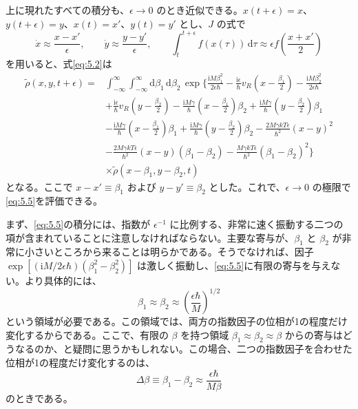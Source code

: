 上に現れたすべての積分も、$\epsilon\to0$ のとき近似できる。$x(t+\epsilon)=x$、$y(t+\epsilon)=y$、$x(t)=x'$、$y(t)=y'$ とし、$J$ の式で
\begin{equation}
\dot x\approx\frac{x-x'}{\epsilon},\qquad
\dot y\approx\frac{y-y'}{\epsilon},\qquad
\int_t^{t+\epsilon}f(x(\tau))\,\mathrm d\tau
\approx\epsilon f\!\left(\frac{x+x'}{2}\right)
\tag{5.4}\label{eq:5.4}
\end{equation}
を用いると、式\eqref{eq:5.2}は
\begin{equation}
\begin{aligned}
\widetilde\rho(x,y,t+\epsilon)
={}&\int_{-\infty}^{\infty}\!\int_{-\infty}^{\infty}
\mathrm d\beta_1\,\mathrm d\beta_2\,
\exp\biggl\{\frac{\mathrm iM\beta_1^2}{2\epsilon\hbar}
-\frac{\mathrm i\epsilon}{\hbar}v_R\!\left(x-\frac{\beta_1}{2}\right)
-\frac{\mathrm iM\beta_2^2}{2\epsilon\hbar}\\
&+\frac{\mathrm i\epsilon}{\hbar}v_R\!\left(y-\frac{\beta_2}{2}\right)
-\frac{\mathrm iM\gamma}{\hbar}\left(x-\frac{\beta_1}{2}\right)\beta_2
+\frac{\mathrm iM\gamma}{\hbar}\left(y-\frac{\beta_2}{2}\right)\beta_1\\
&-\frac{\mathrm iM\gamma}{\hbar}\left(x-\frac{\beta_1}{2}\right)\beta_1
+\frac{\mathrm iM\gamma}{\hbar}\left(y-\frac{\beta_2}{2}\right)\beta_2
-\frac{2M\gamma kT\epsilon}{\hbar^2}(x-y)^2\\
&-\frac{2M\gamma kT\epsilon}{\hbar^2}(x-y)(\beta_1-\beta_2)
-\frac{M\gamma kT\epsilon}{\hbar^2}(\beta_1-\beta_2)^2\biggr\}\\
&\times\widetilde\rho(x-\beta_1,y-\beta_2,t)
\end{aligned}
\tag{5.5}\label{eq:5.5}
\end{equation}
となる。ここで $x-x'\equiv\beta_1$ および $y-y'\equiv\beta_2$ とした。これで、$\epsilon\to0$ の極限で\eqref{eq:5.5}を評価できる。

まず、\eqref{eq:5.5}の積分には、指数が $\epsilon^{-1}$ に比例する、非常に速く振動する二つの項が含まれていることに注意しなければならない。主要な寄与が、$\beta_1$ と $\beta_2$ が非常に小さいところから来ることは明らかである。そうでなければ、因子 $\exp[(\mathrm iM/2\epsilon\hbar)(\beta_1^2-\beta_2^2)]$ は激しく振動し、\eqref{eq:5.5}に有限の寄与を与えない。より具体的には、
\begin{equation}
\beta_1\approx\beta_2\approx\left(\frac{\epsilon\hbar}{M}\right)^{1/2}
\tag{5.6}\label{eq:5.6}
\end{equation}
という領域が必要である。この領域では、両方の指数因子の位相が1の程度だけ変化するからである。ここで、有限の $\beta$ を持つ領域 $\beta_1\approx\beta_2\approx\beta$ からの寄与はどうなるのか、と疑問に思うかもしれない。この場合、二つの指数因子を合わせた位相が1の程度だけ変化するのは、
\begin{equation}
\Delta\beta\equiv\beta_1-\beta_2\approx\frac{\epsilon\hbar}{M\beta}
\tag{5.7}\label{eq:5.7}
\end{equation}
のときである。

